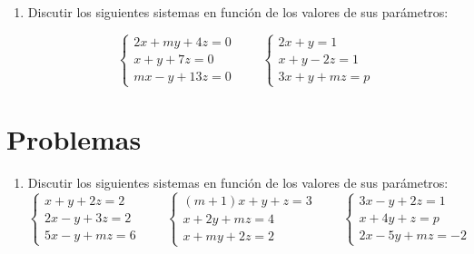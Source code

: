 \documentclass[a4paper]{article}
\begin{document}
\begin{enumerate}[leftmargin=*]
\item Discutir los siguientes sistemas en función de los valores de sus parámetros:

\[
\left\{
\begin{array}{l}
2x+my+4z=0 \\
x+y+7z=0 \\
mx-y+13z=0   
\end{array}\right.
\qquad
\left\{
\begin{array}{l}
2x+y  =1 \\
x+y-2z=1 \\
3x+y+mz=p   
\end{array}\right.
\]
\end{enumerate}




\section*{Problemas}
\begin{enumerate}[leftmargin=*]

\item Discutir los siguientes sistemas en función de los valores de sus parámetros:
\[
\left\{
\begin{array}{l}
x+y+2z=2 \\
2x-y+3z=2 \\
5x-y+mz=6  
\end{array}\right.
\qquad
\left\{
\begin{array}{l}
(m+1)x+y+z=3 \\
x+2y+mz=4 \\
x+my+2z=2  
\end{array}\right.
\qquad
\left\{
\begin{array}{l}
3x-y+2z=1 \\
x+4y+z=p \\
2x-5y+mz=-2  
\end{array}\right.
\] 
\end{enumerate}
\end{document}
